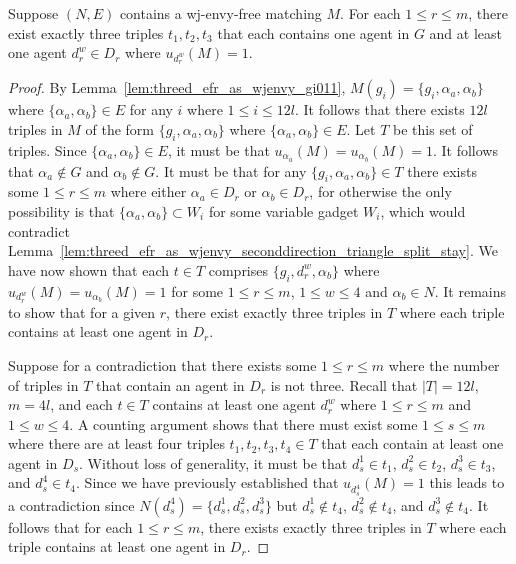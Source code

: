 \begin{lem}
\label{lem:threed_efr_as_3triplesperclausegadget}
Suppose $(N, E)$ contains a wj-envy-free matching $M$. For each $1\leq r \leq m$, there exist exactly three triples $t_1, t_2, t_3$ that each contains one agent in $G$ and at least one agent $d_r^w \in D_r$ where $u_{d_r^w}(M)=1$.
\end{lem}
\begin{proof}
By Lemma~\ref{lem:threed_efr_as_wjenvy_gi011}, $M(g_i) = \{ g_i, \alpha_a, \alpha_b \}$ where $\{ \alpha_a, \alpha_b \} \in E$ for any $i$ where $1\leq i\leq 12l$. It follows that there exists $12l$ triples in $M$ of the form $\{ g_i, \alpha_a, \alpha_b \}$ where $\{ \alpha_a, \alpha_b \} \in E$. Let $T$ be this set of triples. Since $\{ \alpha_a, \alpha_b \} \in E$, it must be that $u_{\alpha_a}(M)=u_{\alpha_b}(M)=1$. It follows that $\alpha_a \notin G$ and $\alpha_b \notin G$. It must be that for any $\{ g_i, \alpha_a, \alpha_b \} \in T$ there exists some $1\leq r\leq m$ where either $\alpha_a \in D_r$ or $\alpha_b \in D_r$, for otherwise the only possibility is that $\{ \alpha_a, \alpha_b \} \subset W_i$ for some variable gadget $W_i$, which would contradict Lemma~\ref{lem:threed_efr_as_wjenvy_seconddirection_triangle_split_stay}. We have now shown that each $t\in T$ comprises $\{ g_i, d_r^w, \alpha_b \}$ where $u_{d_r^w}(M)=u_{\alpha_b}(M)=1$ for some $1\leq r\leq m$, $1\leq w \leq 4$ and $\alpha_b\in N$. It remains to show that for a given $r$, there exist exactly three triples in $T$ where each triple contains at least one agent in $D_r$. 

Suppose for a contradiction that there exists some $1\leq r\leq m$ where the number of triples in $T$ that contain an agent in $D_r$ is not three. Recall that $|T|=12l$, $m=4l$, and each $t\in T$ contains at least one agent $d_r^w$ where $1\leq r\leq m$ and $1\leq w\leq 4$. A counting argument shows that there must exist some $1\leq s\leq m$ where there are at least four triples $t_1,t_2,t_3,t_4 \in T$ that each contain at least one agent in $D_s$. Without loss of generality, it must be that $d_s^1\in t_1$, $d_s^2\in t_2$, $d_s^3\in t_3$, and $d_s^4\in t_4$. Since we have previously established that $u_{d_s^4}(M)=1$ this leads to a contradiction since $N(d_s^4)=\{ d_s^1, d_s^2, d_s^3 \}$ but $d_s^1\notin t_4$, $d_s^2\notin t_4$, and $d_s^3\notin t_4$. It follows that for each $1\leq r\leq m$, there exists exactly three triples in $T$ where each triple contains at least one agent in $D_r$.
\end{proof}

